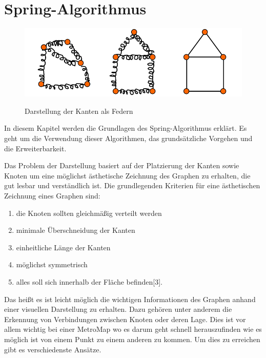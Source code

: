 
\chapter{Spring-Algorithmus}
\label{Kapitel 2}
%
    \begin{figure}[t]
    	\centering
    	{\includegraphics[scale=0.8]{bilder/graphfeder}\label{fig_graphfeder}
    	}\\
    	\caption[Darstellung der Kanten als Federn]{Darstellung der Kanten als Federn}
    	\label{fig_testbild2}
    \end{figure}
In diesem Kapitel werden die Grundlagen des Spring-Algorithmus erklärt. 
Es geht um die Verwendung dieser Algorithmen, das grundsätzliche Vorgehen
und die Erweiterbarkeit.


Das Problem der Darstellung basiert auf der Platzierung der Kanten sowie
Knoten um eine möglichst ästhetische Zeichnung des
Graphen zu erhalten, die gut lesbar und verständlich ist. Die grundlegenden Kriterien für eine ästhetischen Zeichnung eines Graphen sind:
\begin{enumerate}
	\item die Knoten sollten gleichmäßig verteilt werden
	\item minimale Überschneidung der Kanten
	\item einheitliche Länge der Kanten
	\item möglichst symmetrisch
	\item alles soll sich innerhalb der Fläche befinden[3].
\end{enumerate}   

Das heißt es ist leicht möglich
die wichtigen Informationen des Graphen anhand einer visuellen Darstellung zu erhalten. 
Dazu gehören unter anderem die Erkennung von Verbindungen zwischen Knoten oder deren Lage. Dies
ist vor allem wichtig bei einer MetroMap wo es darum geht schnell herauszufinden wie es möglich ist
von einem Punkt zu einem anderen zu kommen.
Um dies zu erreichen gibt es verschiedenste Ansätze.

